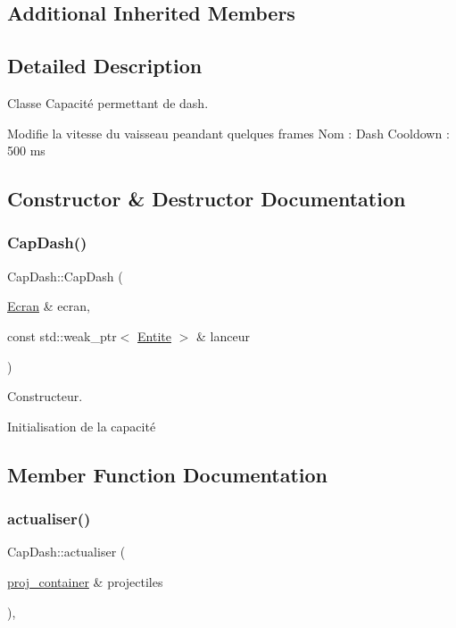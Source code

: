 \subsection*{Additional Inherited Members}


\subsection{Detailed Description}
Classe Capacité permettant de dash. 

Modifie la vitesse du vaisseau peandant quelques frames Nom \+: Dash Cooldown \+: 500 ms 

\subsection{Constructor \& Destructor Documentation}
\mbox{\label{class_cap_dash_af069a87108b24e34bece7567699a625e}} 
\subsubsection{\texorpdfstring{Cap\+Dash()}{CapDash()}}
{\footnotesize\ttfamily Cap\+Dash\+::\+Cap\+Dash (\begin{DoxyParamCaption}\item[{\mbox{\hyperlink{class_ecran}{Ecran}} \&}]{ecran,  }\item[{const std\+::weak\+\_\+ptr$<$ \mbox{\hyperlink{class_entite}{Entite}} $>$ \&}]{lanceur }\end{DoxyParamCaption})}



Constructeur. 

Initialisation de la capacité 

\subsection{Member Function Documentation}
\mbox{\label{class_cap_dash_a09dce88d953b9b6c4b53cdcb168236ab}} 
\subsubsection{\texorpdfstring{actualiser()}{actualiser()}}
{\footnotesize\ttfamily Cap\+Dash\+::actualiser (\begin{DoxyParamCaption}\item[{\mbox{\hyperlink{def__type_8h_a87980cd8ee9533e561a73e8bbc728188}{proj\+\_\+container}} \&}]{projectiles }\end{DoxyParamCaption})\hspace{0.3cm}{\ttfamily [override]}, {\ttfamily [virtual]}}



